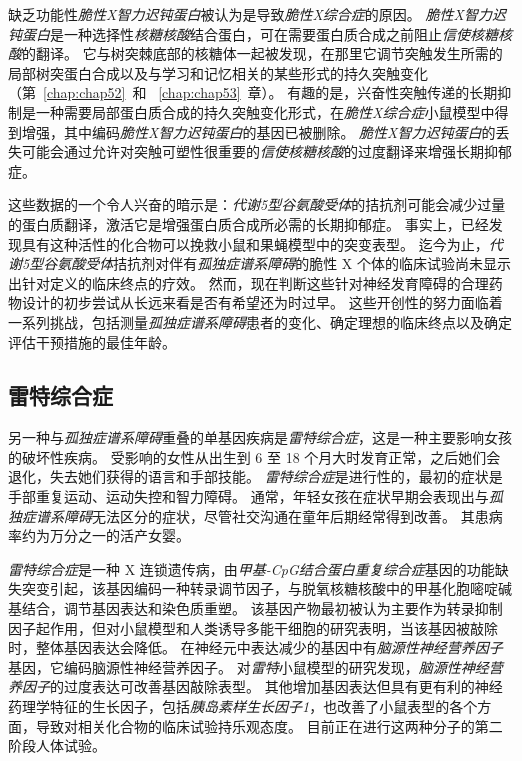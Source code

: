 缺乏功能性\textit{脆性X智力迟钝蛋白}被认为是导致\textit{脆性X综合症}的原因。
\textit{脆性X智力迟钝蛋白}是一种选择性\textit{核糖核酸}结合蛋白，可在需要蛋白质合成之前阻止\textit{信使核糖核酸}的翻译。
它与树突棘底部的核糖体一起被发现，在那里它调节突触发生所需的局部树突蛋白合成以及与学习和记忆相关的某些形式的持久突触变化（第~\ref{chap:chap52}~和 ~\ref{chap:chap53}~章）。
有趣的是，兴奋性突触传递的长期抑制是一种需要局部蛋白质合成的持久突触变化形式，在\textit{脆性X综合症}小鼠模型中得到增强，其中编码\textit{脆性X智力迟钝蛋白}的基因已被删除。
\textit{脆性X智力迟钝蛋白}的丢失可能会通过允许对突触可塑性很重要的\textit{信使核糖核酸}的过度翻译来增强长期抑郁症。


这些数据的一个令人兴奋的暗示是：\textit{代谢5型谷氨酸受体}的拮抗剂可能会减少过量的蛋白质翻译，激活它是增强蛋白质合成所必需的长期抑郁症。
事实上，已经发现具有这种活性的化合物可以挽救小鼠和果蝇模型中的突变表型。
迄今为止，\textit{代谢5型谷氨酸受体}拮抗剂对伴有\textit{孤独症谱系障碍}的脆性 X 个体的临床试验尚未显示出针对定义的临床终点的疗效。
然而，现在判断这些针对神经发育障碍的合理药物设计的初步尝试从长远来看是否有希望还为时过早。
这些开创性的努力面临着一系列挑战，包括测量\textit{孤独症谱系障碍}患者的变化、确定理想的临床终点以及确定评估干预措施的最佳年龄。



\subsection{雷特综合症}

另一种与\textit{孤独症谱系障碍}重叠的单基因疾病是\textit{雷特综合症}，这是一种主要影响女孩的破坏性疾病。
受影响的女性从出生到 6 至 18 个月大时发育正常，之后她们会退化，失去她们获得的语言和手部技能。
\textit{雷特综合症}是进行性的，最初的症状是手部重复运动、运动失控和智力障碍。
通常，年轻女孩在症状早期会表现出与\textit{孤独症谱系障碍}无法区分的症状，尽管社交沟通在童年后期经常得到改善。
其患病率约为万分之一的活产女婴。


\textit{雷特综合症}是一种 X 连锁遗传病，由\textit{甲基-CpG结合蛋白重复综合症}基因的功能缺失突变引起，该基因编码一种转录调节因子，与脱氧核糖核酸中的甲基化胞嘧啶碱基结合，调节基因表达和染色质重塑。
该基因产物最初被认为主要作为转录抑制因子起作用，但对小鼠模型和人类诱导多能干细胞的研究表明，当该基因被敲除时，整体基因表达会降低。
在神经元中表达减少的基因中有\textit{脑源性神经营养因子}基因，它编码脑源性神经营养因子。
对\textit{雷特}小鼠模型的研究发现，\textit{脑源性神经营养因子}的过度表达可改善基因敲除表型。
其他增加基因表达但具有更有利的神经药理学特征的生长因子，包括\textit{胰岛素样生长因子1}，也改善了小鼠表型的各个方面，导致对相关化合物的临床试验持乐观态度。
目前正在进行这两种分子的第二阶段人体试验。


